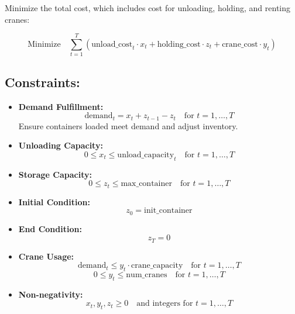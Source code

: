 \documentclass{article}
\begin{document}
Minimize the total cost, which includes cost for unloading, holding, and renting cranes:

\[
\text{Minimize} \quad \sum_{t=1}^{T} \left( \text{unload\_cost}_t \cdot x_t + \text{holding\_cost} \cdot z_t + \text{crane\_cost} \cdot y_t \right)
\]

\subsection*{Constraints:}

\begin{itemize}
    \item \textbf{Demand Fulfillment:}
    \[
    \text{demand}_t = x_t + z_{t-1} - z_t \quad \text{for } t = 1, \ldots, T
    \]
    Ensure containers loaded meet demand and adjust inventory.

    \item \textbf{Unloading Capacity:}
    \[
    0 \leq x_t \leq \text{unload\_capacity}_t \quad \text{for } t = 1, \ldots, T
    \]

    \item \textbf{Storage Capacity:}
    \[
    0 \leq z_t \leq \text{max\_container} \quad \text{for } t = 1, \ldots, T
    \]

    \item \textbf{Initial Condition:}
    \[
    z_0 = \text{init\_container}
    \]

    \item \textbf{End Condition:}
    \[
    z_T = 0
    \]

    \item \textbf{Crane Usage:}
    \[
    \text{demand}_t \leq y_t \cdot \text{crane\_capacity} \quad \text{for } t = 1, \ldots, T
    \]
    \[
    0 \leq y_t \leq \text{num\_cranes} \quad \text{for } t = 1, \ldots, T
    \]

    \item \textbf{Non-negativity:}
    \[
    x_t, y_t, z_t \geq 0 \quad \text{and integers for } t = 1, \ldots, T
    \]
\end{itemize}
\end{document}
